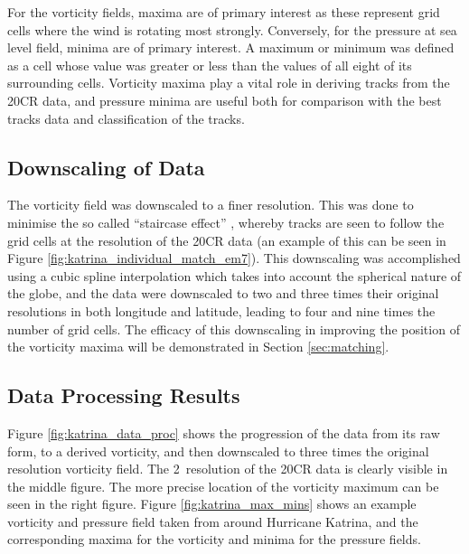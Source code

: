 \documentclass[pdftex,12pt,a4paper]{report}
\begin{document}
For the vorticity fields, maxima are of primary interest as these represent grid cells where the
wind is rotating most strongly. Conversely, for the pressure at sea level field, minima are of
primary interest. A maximum or minimum was defined as a cell whose value was greater or less than
the values of all eight of its surrounding cells. Vorticity maxima play a vital role in deriving
tracks from the 20CR data, and pressure minima are useful both for comparison with the best tracks
data and classification of the tracks.

\subsection{Downscaling of Data}

The vorticity field was downscaled to a finer resolution. This was done to minimise the so called
``staircase effect'' \parencite{hodges1994general}, whereby tracks are seen to follow the grid cells
at the resolution of the 20CR data (an example of this can be seen in Figure
\ref{fig:katrina_individual_match_em7}).  This downscaling was accomplished using a cubic spline
interpolation which takes into account the spherical nature of the globe, and the data were
downscaled to two and three times their original resolutions in both longitude and latitude, leading
to four and nine times the number of grid cells. The efficacy of this downscaling in improving the
position of the vorticity maxima will be demonstrated in Section \ref{sec:matching}.


\subsection{Data Processing Results}

Figure \ref{fig:katrina_data_proc} shows the progression of the data from its raw form, to a derived
vorticity, and then downscaled to three times the original resolution vorticity field.  The
2\textdegree\ resolution of the 20CR data is clearly visible in the middle figure. The more precise
location of the vorticity maximum can be seen in the right figure.  Figure
\ref{fig:katrina_max_mins} shows an example vorticity and pressure field taken from around Hurricane
Katrina, and the corresponding maxima for the vorticity and minima for the pressure fields.
\end{document}
